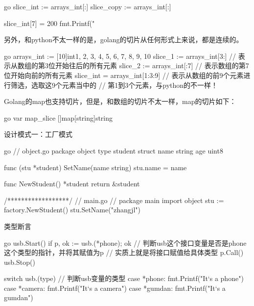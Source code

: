 \begin{outline}[enumerate]
\begin{code-in-enumerate}{go}
slice_int := arrays_int[:]
slice_copy := arrays_int[:]

slice_int[7] = 200
fmt.Printf("%
\end{code-in-enumerate}

  另外，和python不太一样的是，golang的切片从任何形式上来说，都是连续的。
\begin{code-in-enumerate}{go}
arrays_int := [10]int{1, 2, 3, 4, 5, 6, 7, 8, 9, 10}
slice_1 := arrays_int[3:] // 表示从数组的第3位开始往后的所有元素
slice_2 := arrays_int[:7] // 表示数组的第7位开始向前的所有元素
slice_int = arrays_int[1:3:9] // 表示从数组的前9个元素进行筛选，选取这9个元素当中的
                              // 第1到3个元素，与python的不一样！
\end{code-in-enumerate}

  Golang的map也支持切片，但是，和数组的切片不太一样，map的切片如下：
\begin{code-in-enumerate}{go}
var map_slice []map[string]string
\end{code-in-enumerate}

  \1 设计模式一：工厂模式

\begin{code-in-enumerate}{go}
// object.go
package object
type student struct {
    name string
    age  uint8
}

func (stu *student) SetName(name string) {
    stu.name = name
}

func NewStudent() *student {
    return &student{}
}

/******************/
// main.go
// package main
import object
stu := factory.NewStudent()
stu.SetName("zhangjl")
\end{code-in-enumerate}

  \1 类型断言

\begin{code-in-enumerate}{go}
usb.Start()
if p, ok := usb.(*phone); ok { // 判断usb这个接口变量是否是phone这个类型的指针，并将其赋值为p
                               // 实质上就是将接口赋值给具体类型
    p.Call()
}
usb.Stop()

switch usb.(type) { // 判断usb变量的类型
case *phone:
    fmt.Printf("It`s a phone\n")
case *camera:
    fmt.Printf("It`s a camera\n")
case *gumdan:
    fmt.Printf("It`s a gumdan\n")
}
\end{code-in-enumerate}

\end{outline}

